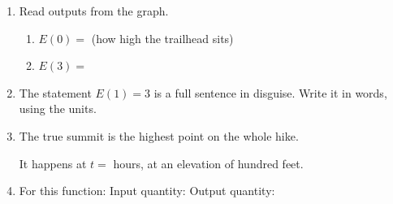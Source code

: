 \documentclass[10pt]{article}
\begin{document}
\boxguard
\begin{tcolorbox}[colback=white, colframe=black!40,
    title=\textbf{Tier R --- Remediate},
    fonttitle=\bfseries, arc=2mm, left=3mm, right=3mm, top=2mm, bottom=2mm]

\begin{enumerate}[itemsep=8pt]
  \item Read outputs from the graph.

        \begin{enumerate}[label=(\alph*), itemsep=4pt]
          \item $E(0) = $  \quad (how high the trailhead sits)
          \item $E(3) = $ 
        \end{enumerate}

  \item The statement $E(1) = 3$ is a full sentence in disguise. Write it in
        words, using the units.

        \vspace{0.05in}

  \item The true summit is the highest point on the whole hike.

        \vspace{0.05in}
        It happens at $t = $  hours, at an elevation of
         hundred feet.

  \item For this function: \quad Input quantity:  \quad
        Output quantity: 
\end{enumerate}
\end{tcolorbox}

\vspace{0.1in}
\end{document}
